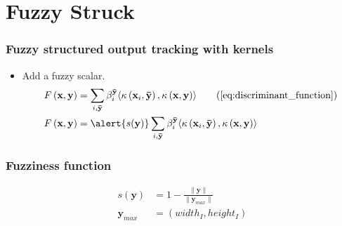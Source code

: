 \section{Fuzzy Struck}

\begin{frame}
    \frametitle{Fuzzy structured output tracking with kernels}
    \begin{itemize}
        \item Add a fuzzy scalar.
            \begin{align}
                F\left(\mathbf{x}, \mathbf{y}\right) &= \sum_{i, \mathbf{\bar{y}}} \beta_i^\mathbf{\bar{y}}
                    \langle \kappa\left(\mathbf{x}_i, \mathbf{\bar{y}}\right),
                    \kappa\left(\mathbf{x}, \mathbf{y}\right) \rangle
                    \tag{\ref{eq:discriminant_function}} \\
                F\left(\mathbf{x}, \mathbf{y}\right) &= \alert{s(\mathbf{y})} \sum_{i, \mathbf{\bar{y}}} \beta_i^\mathbf{\bar{y}}
                    \langle \kappa\left(\mathbf{x}_i, \mathbf{\bar{y}}\right),
                    \kappa\left(\mathbf{x}, \mathbf{y}\right) \rangle
            \end{align}
    \end{itemize}
\end{frame}

\begin{frame}
    \frametitle{Fuzziness function}
    \begin{align}
        s(\mathbf{y}) &= 1 - \frac{\|\mathbf{y}\|}{\|\mathbf{y}_{max}\|} \\
        \mathbf{y}_{max} &= (width_I, height_I)
    \end{align}
\end{frame}

